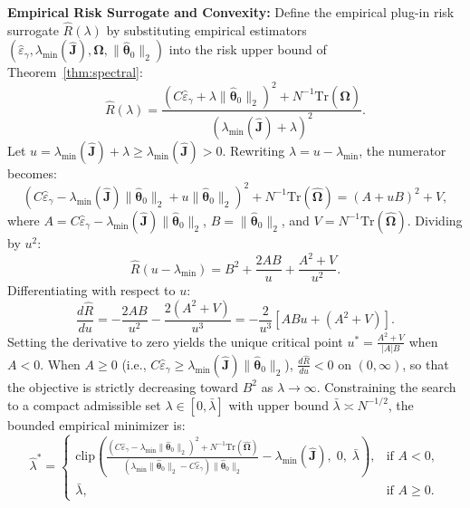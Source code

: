 \documentclass[twoside]{article}
\theoremstyle{definition}
\begin{document}
\textbf{Empirical Risk Surrogate and Convexity:}
Define the empirical plug-in risk surrogate $\hat{R}(\lambda)$ by substituting empirical estimators $(\hat{\varepsilon}_\gamma, \lambda_{\min}(\hat{\boldsymbol{J}}), \hat{\boldsymbol{\Omega}}, \|\hat{\boldsymbol{\theta}}_0\|_2)$ into the risk upper bound of Theorem~\ref{thm:spectral}:
\begin{equation}
    \hat{R}(\lambda) = \frac{(C \hat{\varepsilon}_\gamma + \lambda \|\hat{\boldsymbol{\theta}}_0\|_2)^2 + N^{-1}\mathrm{Tr}(\hat{\boldsymbol{\Omega}})}{(\lambda_{\min}(\hat{\boldsymbol{J}}) + \lambda)^2}.
\end{equation}
Let $u = \lambda_{\min}(\hat{\boldsymbol{J}}) + \lambda \ge \lambda_{\min}(\hat{\boldsymbol{J}}) > 0$. Rewriting $\lambda = u - \lambda_{\min}$, the numerator becomes:
\begin{equation}
    \left( C \hat{\varepsilon}_\gamma - \lambda_{\min}(\hat{\boldsymbol{J}}) \|\hat{\boldsymbol{\theta}}_0\|_2 + u \|\hat{\boldsymbol{\theta}}_0\|_2 \right)^2 + N^{-1}\mathrm{Tr}(\hat{\boldsymbol{\Omega}}) = (A + u B)^2 + V,
\end{equation}
where $A = C \hat{\varepsilon}_\gamma - \lambda_{\min}(\hat{\boldsymbol{J}}) \|\hat{\boldsymbol{\theta}}_0\|_2$, $B = \|\hat{\boldsymbol{\theta}}_0\|_2$, and $V = N^{-1}\mathrm{Tr}(\hat{\boldsymbol{\Omega}})$.
Dividing by $u^2$:
\begin{equation}
    \hat{R}(u - \lambda_{\min}) = B^2 + \frac{2AB}{u} + \frac{A^2 + V}{u^2}.
\end{equation}
Differentiating with respect to $u$:
\begin{equation}
    \frac{d \hat{R}}{du} = -\frac{2AB}{u^2} - \frac{2(A^2 + V)}{u^3} = -\frac{2}{u^3} \left[ AB u + (A^2 + V) \right].
\end{equation}
Setting the derivative to zero yields the unique critical point $u^* = \frac{A^2 + V}{|A| B}$ when $A < 0$. When $A \ge 0$ (i.e., $C \hat{\varepsilon}_\gamma \ge \lambda_{\min}(\hat{\boldsymbol{J}}) \|\hat{\boldsymbol{\theta}}_0\|_2$), $\frac{d\hat{R}}{du} < 0$ on $(0, \infty)$, so that the objective is strictly decreasing toward $B^2$ as $\lambda \to \infty$. Constraining the search to a compact admissible set $\lambda \in [0, \bar{\lambda}]$ with upper bound $\bar{\lambda} \asymp N^{-1/2}$, the bounded empirical minimizer is:
\begin{equation}
    \hat{\lambda}^* = \begin{cases} 
    \mathrm{clip}\left( \frac{(C\hat{\varepsilon}_\gamma - \lambda_{\min}\|\hat{\boldsymbol{\theta}}_0\|_2)^2 + N^{-1}\mathrm{Tr}(\hat{\boldsymbol{\Omega}})}{(\lambda_{\min}\|\hat{\boldsymbol{\theta}}_0\|_2 - C\hat{\varepsilon}_\gamma)\|\hat{\boldsymbol{\theta}}_0\|_2} - \lambda_{\min}(\hat{\boldsymbol{J}}), \; 0, \; \bar{\lambda} \right), & \text{if } A < 0, \\
    \bar{\lambda}, & \text{if } A \ge 0.
    \end{cases}
\end{equation}
\end{document}
